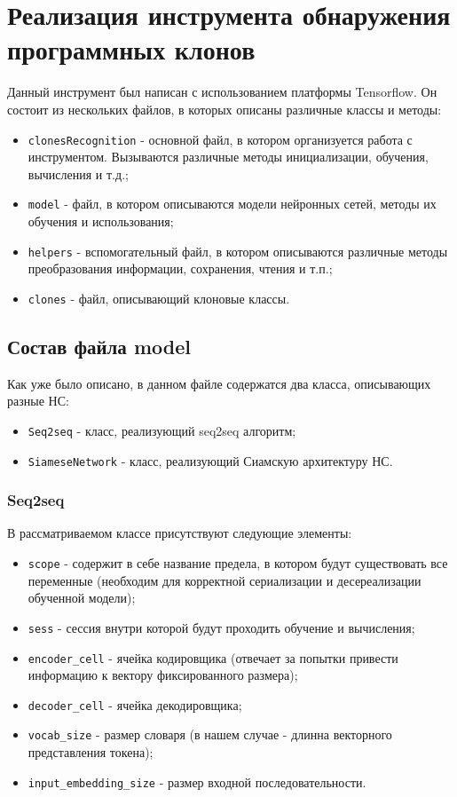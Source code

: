 \section{Реализация инструмента обнаружения программных клонов}

Данный инструмент был написан с использованием платформы Tensorflow. Он состоит из нескольких файлов, в которых описаны различные классы и методы:

\begin{itemize}
\setlength\itemsep{0mm}
\item \texttt{clonesRecognition} - основной файл, в котором организуется работа с инструментом. Вызываются различные методы инициализации, обучения, вычисления и т.д.;
\item \texttt{model} - файл, в котором описываются модели нейронных сетей, методы их обучения и использования;
\item \texttt{helpers} - вспомогательный файл, в котором описываются различные методы преобразования информации, сохранения, чтения и т.п.;
\item \texttt{clones} - файл, описывающий клоновые классы.
\end{itemize}

\subsection{Состав файла model}

Как уже было описано, в данном файле содержатся два класса, описывающих разные НС:

\begin{itemize}
\setlength\itemsep{0mm}
\item \texttt{Seq2seq} - класс, реализующий seq2seq алгоритм;
\item \texttt{SiameseNetwork} - класс, реализующий Сиамскую архитектуру НС.
\end{itemize}

\subsubsection{Seq2seq}

В рассматриваемом классе присутствуют следующие элементы:

\begin{itemize}
\setlength\itemsep{0mm}
\item \texttt{scope} - содержит в себе название предела, в котором будут существовать все переменные (необходим для корректной сериализации и десереализации обученной модели);
\item \texttt{sess} - сессия внутри которой будут проходить обучение и вычисления;
\item \texttt{encoder\_cell} - ячейка кодировщика (отвечает за попытки привести информацию к вектору фиксированного размера);
\item \texttt{decoder\_cell} - ячейка декодировщика;
\item \texttt{vocab\_size} - размер словаря (в нашем случае - длинна векторного представления токена);
\item \texttt{input\_embedding\_size} - размер входной последовательности.
\end{itemize}


